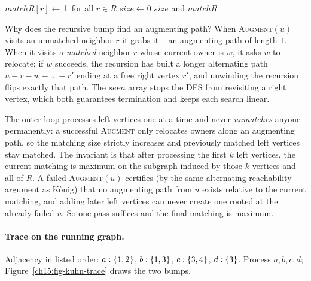 \begin{algorithm}[H]
\caption{\textsc{MaxBipartiteMatching}$(L,R,E)$}
\label{ch15:alg-kuhn}
\DontPrintSemicolon
$\mathit{matchR}[r]\gets\bot$ for all $r\in R$\;
$\mathit{size}\gets 0$\;
\Return $\mathit{size}$ and $\mathit{matchR}$\;
\end{algorithm}

\begin{whybox}
Why does the recursive bump find an augmenting path? When \textsc{Augment}$(u)$
visits an unmatched neighbor $r$ it grabs it -- an augmenting path of length $1$.
When it visits a \emph{matched} neighbor $r$ whose current owner is $w$, it asks
$w$ to relocate; if $w$ succeeds, the recursion has built a longer alternating
path $u\!-\!r\!-\!w\!-\!\dots\!-\!r'$ ending at a free right vertex $r'$, and
unwinding the recursion flips exactly that path. The $\mathit{seen}$ array stops
the DFS from revisiting a right vertex, which both guarantees termination and
keeps each search linear.
\end{whybox}

\begin{whybox}
The outer loop processes left vertices one at a time and never \emph{unmatches}
anyone permanently: a successful \textsc{Augment} only relocates owners along an
augmenting path, so the matching size strictly increases and previously matched
left vertices stay matched. The invariant is that after processing the first $k$
left vertices, the current matching is maximum on the subgraph induced by those
$k$ vertices and all of $R$. A failed \textsc{Augment}$(u)$ certifies (by the
same alternating-reachability argument as K\H{o}nig) that no augmenting path from
$u$ exists relative to the current matching, and adding later left vertices can
never create one rooted at the already-failed $u$. So one pass suffices and the
final matching is maximum.
\end{whybox}

\paragraph{Trace on the running graph.}
Adjacency in listed order: $a:\{1,2\}$, $b:\{1,3\}$, $c:\{3,4\}$,
$d:\{3\}$. Process $a,b,c,d$; Figure~\ref{ch15:fig-kuhn-trace} draws the two bumps.

